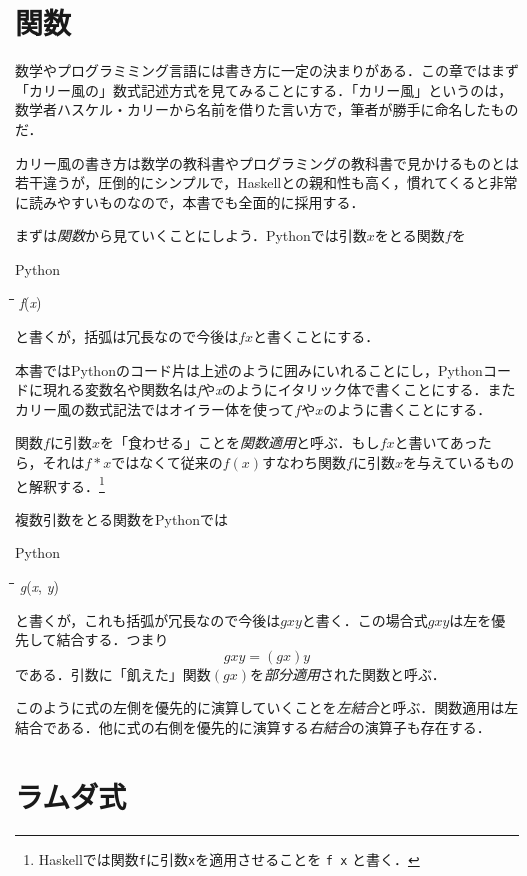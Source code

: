 \documentclass[twocolumn]{jsbook}
\newcommand{\keyword}[1]{{\emph{#1}}}
\newcommand{\code}[1]{\texttt{#1}}
\newenvironment{pythoncode}{\begin{itembox}[r]{Python}}{\end{itembox}}
\newenvironment{python}{\begin{tabbing}\hspace*{1em}\=\hspace*{1em}\=\hspace*{1em}\=\hspace*{1em}\=\kill}{\end{tabbing}}
\newcommand{\pthnId}[1]{\textit{#1}}
\begin{document}
\section{関数}

数学やプログラミミング言語には書き方に一定の決まりがある．この章ではまず「カリー風の」数式記述方式を見てみることにする．「カリー風」というのは，数学者ハスケル・カリーから名前を借りた言い方で，筆者が勝手に命名したものだ．

カリー風の書き方は数学の教科書やプログラミングの教科書で見かけるものとは若干違うが，圧倒的にシンプルで，Haskellとの親和性も高く，慣れてくると非常に読みやすいものなので，本書でも全面的に採用する．

まずは\keyword{関数}から見ていくことにしよう．Pythonでは引数$x$をとる関数$f$を
\begin{pythoncode}
\begin{python}
\pthnId{f}(\pthnId{x})
\end{python}
\end{pythoncode}
と書くが，括弧は冗長なので今後は$fx$と書くことにする．

本書ではPythonのコード片は上述のように囲みにいれることにし，Pythonコードに現れる変数名や関数名は\pthnId{f}や\pthnId{x}のようにイタリック体で書くことにする．またカリー風の数式記法ではオイラー体を使って$f$や$x$のように書くことにする．

関数$f$に引数$x$を「食わせる」ことを\keyword{関数適用}と呼ぶ．もし$fx$と書いてあったら，それは$f*x$ではなくて従来の$f(x)$すなわち関数$f$に引数$x$を与えているものと解釈する．\footnote{Haskellでは関数\code{f}に引数\code{x}を適用させることを \code{f x} と書く．}

複数引数をとる関数をPythonでは
\begin{pythoncode}
\begin{python}
\pthnId{g}(\pthnId{x}, \pthnId{y})
\end{python}
\end{pythoncode}
と書くが，これも括弧が冗長なので今後は$gxy$と書く．この場合式$gxy$は左を優先して結合する．つまり$$gxy=(gx)y$$である．引数に「飢えた」関数$(gx)$を\keyword{部分適用}された関数と呼ぶ．

このように式の左側を優先的に演算していくことを\keyword{左結合}と呼ぶ．関数適用は左結合である．他に式の右側を優先的に演算する\keyword{右結合}の演算子も存在する．

\section{ラムダ式}
\end{document}
